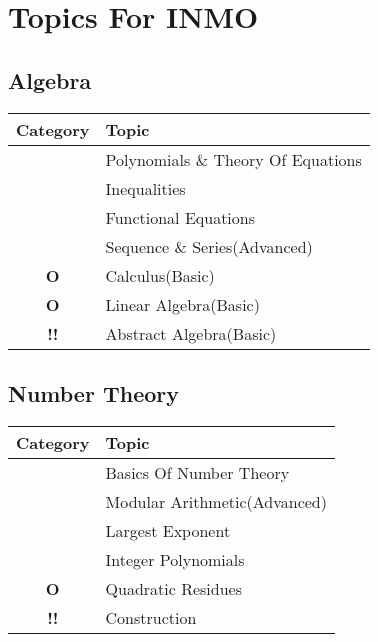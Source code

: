 \documentclass[11pt]{scrartcl}
\providecommand{\isRq}{{\color{green!60!black}\CheckmarkBold}}
\providecommand{\isUs}{{\color{cyan}\sffamily\bfseries O}}
\providecommand{\isAv}{{\color{gray}\sffamily\bfseries !!}}
\begin{document}
\section{Topics For INMO}
\subsection{Algebra}
\begin{center}
  \begin{tabular}{cp{12cm}}
  \toprule Category & Topic \\ \midrule
  \isRq & Polynomials \& Theory Of Equations\\
  \isRq & Inequalities\\
  \isRq & Functional Equations\\
  \isRq & Sequence \& Series(Advanced)\\
  \isUs & Calculus(Basic)\\
  \isUs & Linear Algebra(Basic)\\
  \isAv & Abstract Algebra(Basic)\\
\bottomrule
\end{tabular}
\end{center}


\subsection{Number Theory}
\begin{center}
  \begin{tabular}{cp{12cm}}
  \toprule Category & Topic \\ \midrule
  \isRq & Basics Of Number Theory\\
  \isRq & Modular Arithmetic(Advanced)\\
  \isRq & Largest Exponent\\
  \isRq & Integer Polynomials\\
  \isUs & Quadratic Residues\\
  \isAv & Construction\\
\bottomrule
\end{tabular}
\end{center} 
\end{document}
